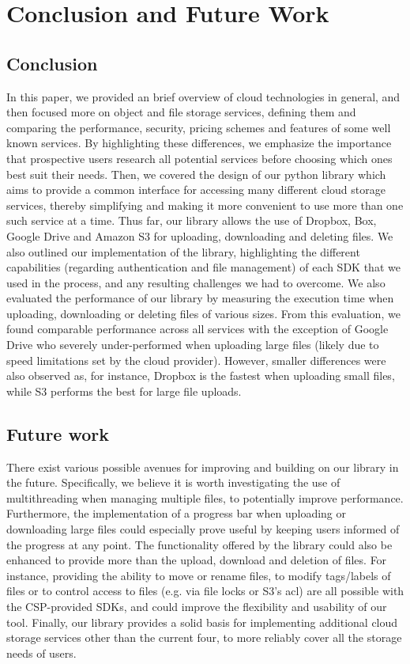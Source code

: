 \chapter{Conclusion and Future Work}\label{ch:conclusion}

\section{Conclusion}
In this paper, we provided an brief overview of cloud technologies in general, and then focused more on object and file storage services, defining them and comparing the performance, security, pricing schemes and features of some well known services. By highlighting these differences, we emphasize the importance that prospective users research all potential services before choosing which ones best suit their needs. Then, we covered the design of our python library which aims to provide a common interface for accessing many different cloud storage services, thereby simplifying and making it more convenient to use more than one such service at a time. Thus far, our library allows the use of Dropbox, Box, Google Drive and Amazon S3 for uploading, downloading and deleting files. We also outlined our implementation of the library, highlighting the different capabilities (regarding authentication and file management) of each SDK that we used in the process, and any resulting challenges we had to overcome. We also evaluated the performance of our library by measuring the execution time when uploading, downloading or deleting files of various sizes. From this evaluation, we found comparable performance across all services with the exception of Google Drive who severely under-performed when uploading large files (likely due to speed limitations set by the cloud provider). However, smaller differences were also observed as, for instance, Dropbox is the fastest when uploading small files, while S3 performs the best for large file uploads.

\section{Future work}
There exist various possible avenues for improving and building on our library in the future. Specifically, we believe it is worth investigating the use of multithreading when managing multiple files, to potentially improve performance.  Furthermore, the implementation of a progress bar when uploading or downloading large files could especially prove useful by keeping users informed of the progress at any point. The functionality offered by the library  could also be enhanced to provide more than the upload, download and deletion of files. For instance, providing the ability to move or rename files, to modify tags/labels of files or to control access to files (e.g. via file locks or S3's \ac{acl}) are all possible with the CSP-provided SDKs, and could improve the flexibility and usability of our tool. Finally, our library provides a solid basis for implementing additional cloud storage services other than the current four, to more reliably cover all the storage needs of users. 